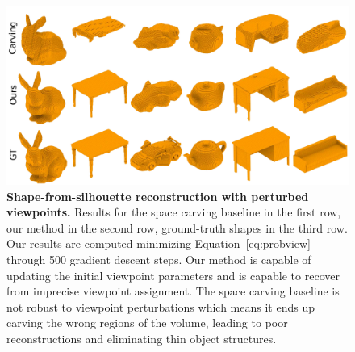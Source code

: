 \begin{figure}[t]
\centering
\includegraphics[width=0.9\linewidth]{dsp/figs/probcomp.pdf}
\caption{\small \label{fig:probcomp} \textbf{Shape-from-silhouette reconstruction with perturbed viewpoints.}
Results for the space carving baseline in the first row, our method in the second row, ground-truth shapes in the third row.
Our results are computed minimizing Equation~\ref{eq:probview} through 500 gradient descent steps.
Our method is capable of updating the initial viewpoint parameters and is capable to recover from imprecise viewpoint assignment.
The space carving baseline is not robust to viewpoint perturbations which means it ends up
carving the wrong regions of the volume, leading to poor reconstructions and eliminating
thin object structures.
}
\end{figure}

